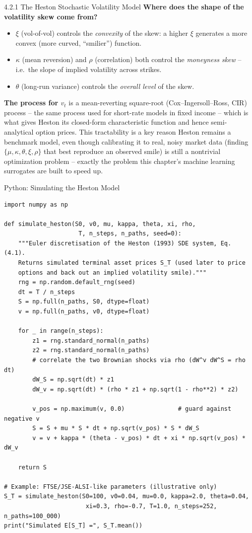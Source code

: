 \documentclass[aspectratio=169,10pt]{beamer}
\begin{document}
\begin{frame}[allowframebreaks]{4.2.1 The Heston Stochastic Volatility Model}
\textbf{Where does the shape of the volatility skew come from?}
\begin{itemize}
  \item $\xi$ (vol-of-vol) controls the \emph{convexity} of the skew: a
        higher $\xi$ generates a more convex (more curved, ``smilier'')
        function.
  \item $\kappa$ (mean reversion) and $\rho$ (correlation) both control the
        \emph{moneyness skew} -- i.e.\ the slope of implied volatility
        across strikes.
  \item $\theta$ (long-run variance) controls the \emph{overall level} of
        the skew.
\end{itemize}

\textbf{The process for $v_t$} is a mean-reverting square-root
(Cox--Ingersoll--Ross, CIR) process -- the same process used for
short-rate models in fixed income -- which is what gives Heston its
closed-form characteristic function and hence semi-analytical option
prices. This tractability is a key reason Heston remains a benchmark
model, even though calibrating it to real, noisy market data (finding
$\{\mu,\kappa,\theta,\xi,\rho\}$ that best reproduce an observed smile) is
still a nontrivial optimization problem -- exactly the problem this
chapter's machine learning surrogates are built to speed up.

\end{frame}

\begin{frame}[fragile]{Python: Simulating the Heston Model}
\begin{lstlisting}[style=python]
import numpy as np

def simulate_heston(S0, v0, mu, kappa, theta, xi, rho,
                     T, n_steps, n_paths, seed=0):
    """Euler discretisation of the Heston (1993) SDE system, Eq. (4.1).
    Returns simulated terminal asset prices S_T (used later to price
    options and back out an implied volatility smile)."""
    rng = np.random.default_rng(seed)
    dt = T / n_steps
    S = np.full(n_paths, S0, dtype=float)
    v = np.full(n_paths, v0, dtype=float)

    for _ in range(n_steps):
        z1 = rng.standard_normal(n_paths)
        z2 = rng.standard_normal(n_paths)
        # correlate the two Brownian shocks via rho (dW^v dW^S = rho dt)
        dW_S = np.sqrt(dt) * z1
        dW_v = np.sqrt(dt) * (rho * z1 + np.sqrt(1 - rho**2) * z2)

        v_pos = np.maximum(v, 0.0)               # guard against negative v
        S = S + mu * S * dt + np.sqrt(v_pos) * S * dW_S
        v = v + kappa * (theta - v_pos) * dt + xi * np.sqrt(v_pos) * dW_v

    return S

# Example: FTSE/JSE-ALSI-like parameters (illustrative only)
S_T = simulate_heston(S0=100, v0=0.04, mu=0.0, kappa=2.0, theta=0.04,
                       xi=0.3, rho=-0.7, T=1.0, n_steps=252, n_paths=100_000)
print("Simulated E[S_T] =", S_T.mean())
\end{lstlisting}
\end{frame}
\end{document}
